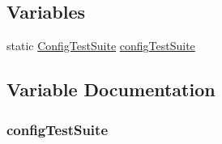 \subsection*{Variables}
\begin{DoxyCompactItemize}
\item 
static \hyperlink{classConfigTestSuite}{Config\+Test\+Suite} \hyperlink{config-test-suite_8cc_ae274e242f1cd3a815f3ae853ca776115}{config\+Test\+Suite}
\end{DoxyCompactItemize}


\subsection{Variable Documentation}
\subsubsection[{\texorpdfstring{config\+Test\+Suite}{configTestSuite}}]{ config\+Test\+Suite\hspace{0.3cm}{\ttfamily [static]}}\hypertarget{config-test-suite_8cc_ae274e242f1cd3a815f3ae853ca776115}{}\label{config-test-suite_8cc_ae274e242f1cd3a815f3ae853ca776115}
